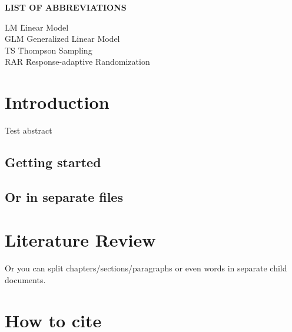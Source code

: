 \documentclass[12pt,,letterpaper,twoside]{report}
\begin{document}
\begin{center}
{\normalsize \textbf{LIST OF ABBREVIATIONS}}
\end{center}

\newcommand{\Ab}[2]{\noindent  #1 \> #2 \\}
\newcommand{\Abi}[2]{\noindent #1 \hspace{1.5cm} \= #2 \\}

\begin{tabbing}
\Abi{LM}{Linear Model}\Abi{GLM}{Generalized Linear
Model}\Abi{TS}{Thompson Sampling}\Abi{RAR}{Response-adaptive
Randomization}
\end{tabbing}

\clearpage



\hypertarget{introduction}{%
\section{Introduction}\label{introduction}}

Test abstract


\hypertarget{getting-started}{%
\subsection{Getting started}\label{getting-started}}

\hypertarget{or-in-separate-files}{%
\subsection{Or in separate files}\label{or-in-separate-files}}

\hypertarget{literature-review}{%
\section{Literature Review}\label{literature-review}}

Or you can split chapters/sections/paragraphs or even words in separate
child documents.

\hypertarget{how-to-cite}{%
\section{How to cite}\label{how-to-cite}}
\end{document}
